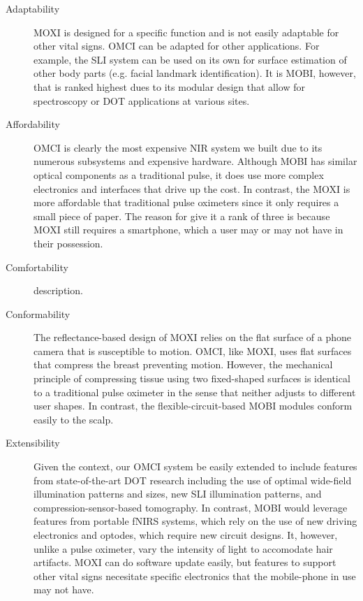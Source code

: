 \begin{description}
   \item[Adaptability] \ac{MOXI} is designed for a specific function and is not easily adaptable for other vital signs. \ac{OMCI} can be adapted for other applications. For example, the \ac{SLI} system can be used on its own for surface estimation of other body parts (e.g. facial landmark identification). It is \ac{MOBI}, however, that is ranked highest dues to its modular design that allow for spectroscopy or \ac{DOT} applications at various sites. 
   
   \item[Affordability] \ac{OMCI} is clearly the most expensive \ac{NIR} system we built due to its numerous subsystems and expensive hardware. Although \ac{MOBI} has similar optical components as a traditional pulse, it does use more complex electronics and interfaces that drive up the cost. In contrast, the \ac{MOXI} is more affordable that traditional pulse oximeters since it only requires a small piece of paper. The reason for give it a rank of three is because \ac{MOXI} still requires a smartphone, which a user may or may not have in their possession. 
  
   \item[Comfortability] description.
   
   \item[Conformability] The reflectance-based design of \ac{MOXI} relies on the flat surface of a phone camera that is susceptible to motion. \ac{OMCI}, like \ac{MOXI}, uses flat surfaces that compress the breast preventing motion. However, the mechanical principle of compressing tissue using two fixed-shaped surfaces is identical to a traditional pulse oximeter in the sense that neither adjusts to different user shapes. In contrast, the flexible-circuit-based \ac{MOBI} modules conform easily to the scalp. 
   
   \item[Extensibility] Given the context, our \ac{OMCI} system be easily extended to include features from state-of-the-art \ac{DOT} research including the use of optimal wide-field illumination patterns and sizes, new \ac{SLI} illumination patterns, and compression-sensor-based tomography.  In contrast, \ac{MOBI} would leverage features from portable fNIRS systems, which rely on the use of new driving electronics and optodes, which require new circuit designs. It, however, unlike a pulse oximeter, vary the intensity of light to accomodate hair artifacts. \ac{MOXI} can do software update easily, but features to support other vital signs necesitate specific electronics that the mobile-phone in use may not have. 
   

\end{description}
